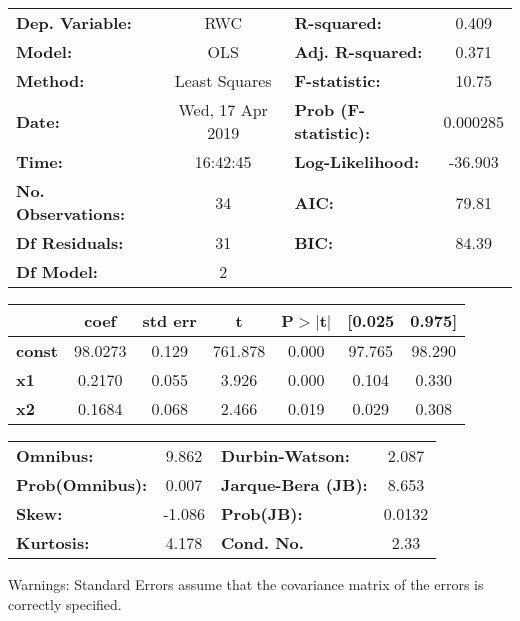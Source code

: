 \begin{center}
\begin{tabular}{lclc}
\toprule
\textbf{Dep. Variable:}    &       RWC        & \textbf{  R-squared:         } &     0.409   \\
\textbf{Model:}            &       OLS        & \textbf{  Adj. R-squared:    } &     0.371   \\
\textbf{Method:}           &  Least Squares   & \textbf{  F-statistic:       } &     10.75   \\
\textbf{Date:}             & Wed, 17 Apr 2019 & \textbf{  Prob (F-statistic):} &  0.000285   \\
\textbf{Time:}             &     16:42:45     & \textbf{  Log-Likelihood:    } &   -36.903   \\
\textbf{No. Observations:} &          34      & \textbf{  AIC:               } &     79.81   \\
\textbf{Df Residuals:}     &          31      & \textbf{  BIC:               } &     84.39   \\
\textbf{Df Model:}         &           2      & \textbf{                     } &             \\
\bottomrule
\end{tabular}
\begin{tabular}{lcccccc}
               & \textbf{coef} & \textbf{std err} & \textbf{t} & \textbf{P$>$$|$t$|$} & \textbf{[0.025} & \textbf{0.975]}  \\
\midrule
\textbf{const} &      98.0273  &        0.129     &   761.878  &         0.000        &       97.765    &       98.290     \\
\textbf{x1}    &       0.2170  &        0.055     &     3.926  &         0.000        &        0.104    &        0.330     \\
\textbf{x2}    &       0.1684  &        0.068     &     2.466  &         0.019        &        0.029    &        0.308     \\
\bottomrule
\end{tabular}
\begin{tabular}{lclc}
\textbf{Omnibus:}       &  9.862 & \textbf{  Durbin-Watson:     } &    2.087  \\
\textbf{Prob(Omnibus):} &  0.007 & \textbf{  Jarque-Bera (JB):  } &    8.653  \\
\textbf{Skew:}          & -1.086 & \textbf{  Prob(JB):          } &   0.0132  \\
\textbf{Kurtosis:}      &  4.178 & \textbf{  Cond. No.          } &     2.33  \\
\bottomrule
\end{tabular}
\end{center}

Warnings: \newline
 [1] Standard Errors assume that the covariance matrix of the errors is correctly specified.